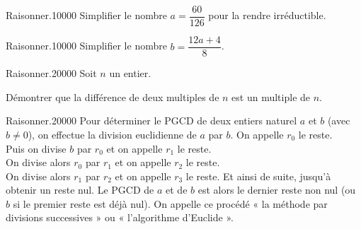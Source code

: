 \begin{pageAuto} 

 
\begin{ExoAutoN}{Raisonner.}{1}{0}{0}{0}{0}
Simplifier le nombre $a=\dfrac{60}{126}$ pour la rendre irréductible. 
\end{ExoAutoN}
\begin{ExoAutoN}{Raisonner.}{1}{0}{0}{0}{0}
Simplifier le nombre $b=\dfrac{12a+4}{8}$. 
\end{ExoAutoN}


\begin{ExoAutoN}{Raisonner.}{2}{0}{0}{0}{0}
Soit $n$ un entier.

Démontrer que la différence de deux multiples de $n$ est un multiple de $n$. 
\end{ExoAutoN}

\begin{ExoAutoN}{Raisonner.}{2}{0}{0}{0}{0}
  Pour déterminer le PGCD de deux entiers naturel $a$ et $b$ (avec $b \neq 0$),
  on effectue la division euclidienne de $a$ par $b$. On appelle $r_0$ le reste. \\
Puis on divise $b$ par $r_0$ et on appelle $r_1$ le reste. \\
On divise alors $r_0$ par $r_1$ et on appelle $r_2$ le reste.\\ 
On divise alors $r_1$ par $r_2$ et on appelle $r_3$ le reste. Et ainsi de suite,
jusqu'à obtenir un reste nul. 
Le PGCD de $a$ et de $b$ est alors le dernier reste non nul (ou $b$
si le premier reste est déjà nul).
On appelle ce procédé « la méthode par divisions successives » ou
« l'algorithme d'Euclide ». 

\begin{enumerate}[leftmargin=*]


\end{enumerate}
\end{ExoAutoN}
\end{pageAuto}
